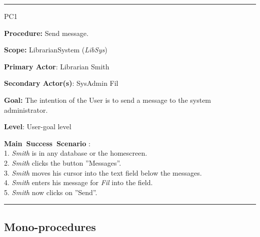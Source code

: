 \vspace{0.5cm}
\hrule
\begin{lyxlist}{PC1}
\small{
\item [\textbf{Procedure:}] Send message.
\item [\textbf{Scope:}] LibrarianSystem (\emph{LibSys})
\item [\textbf{Primary Actor}:] Librarian Smith
\item [\textbf{Secondary Actor(s)}:] SysAdmin Fil
\item [\textbf{Goal:}] The intention of the User is to send a message to the
system administrator.
\item [\textbf{Level}:] User-goal level
\item [\textbf{Main~Success~Scenario}]:\\
1. \emph{Smith} is in any database or the homescreen.\\
2. \emph{Smith} clicks the button ''Messages''.\\
3. \emph{Smith} moves his cursor into the text field below the messages.\\
4. \emph{Smith} enters his message for \emph{Fil} into the field.\\
5. \emph{Smith} now clicks on ''Send''.

}

\end{lyxlist}
\hrule

\subsection{Mono-procedures}

